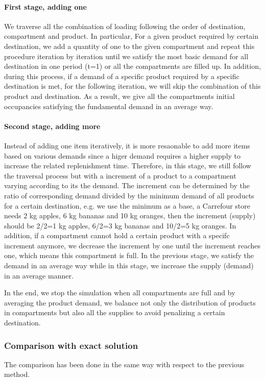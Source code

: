 \documentclass{article}
\begin{document}
\paragraph{First stage, adding one}
We traverse all the combination of loading following the order of destination, compartment and product. In particular, For a given product required by certain destination, we add a quantity of one to the given compartment and repeat this procedure iteration by iteration until we satisfy the most basic demand for all destination in one period (t=1) or all the compartments are filled up. In addition, during this process, if a demand of a specific product required by a specific destination is met, for the following iteration, we will skip the combination of this product and destination. As a result, we give all the compartments initial occupancies satisfying the fundamental demand in an average way.
\paragraph{Second stage, adding more}
Instead of adding one item iteratively, it is more resaonable to add more items based on various demands since a higer demand requires a higher supply to increase the related replenishment time. Therefore, in this stage, we still follow the traversal process but with a increment of a product to a compartment varying according to its the demand. The increment can be determined by the ratio of corresponding demand divided by the minimum demand of all products for a certain destination, e.g. we use the minimum as a base, a Carrefour store needs 2 kg apples, 6 kg bananas and 10 kg oranges, then the increment (supply) should be 2/2=1 kg apples, 6/2=3 kg bananas and 10/2=5 kg oranges. In addition, if a compartment cannot hold a certain product with a specifc increment anymore, we decrease the increment by one until the increment reaches one, which means this compartment is full. In the previous stage, we satisfy the demand in an average way while in this stage, we increase the supply (demand) in an average manner. 

In the end, we stop the simulation when all compartments are full and by averaging the product demand, we balance not only the distribution of products in compartments but also all the supplies to avoid penalizing a certain destination.

\subsubsection{Comparison with exact solution}
The comparison has been done in the same way with respect to the previous method. 
\end{document}
